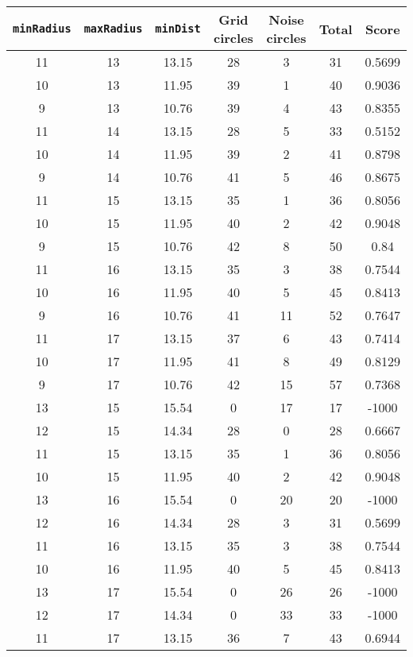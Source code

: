 \documentclass[letterpaper, 12pt]{article}
\begin{document}
\begin{longtable}{|c|c|c|c|c|c|c|}
\hline
\textbf{\texttt{minRadius}} & \textbf{\texttt{maxRadius}} & \textbf{\texttt{minDist}} & \textbf{Grid circles} & \textbf{Noise circles} & \textbf{Total} & \textbf{Score} \\
\hline
11 & 13 & 13.15 & 28 & 3 & 31 & 0.5699 \\
\hline
10 & 13 & 11.95 & 39 & 1 & 40 & 0.9036 \\
\hline
9 & 13 & 10.76 & 39 & 4 & 43 & 0.8355 \\
\hline
11 & 14 & 13.15 & 28 & 5 & 33 & 0.5152 \\
\hline
10 & 14 & 11.95 & 39 & 2 & 41 & 0.8798 \\
\hline
9 & 14 & 10.76 & 41 & 5 & 46 & 0.8675 \\
\hline
11 & 15 & 13.15 & 35 & 1 & 36 & 0.8056 \\
\hline
10 & 15 & 11.95 & 40 & 2 & 42 & 0.9048 \\
\hline
9 & 15 & 10.76 & 42 & 8 & 50 & 0.84 \\
\hline
11 & 16 & 13.15 & 35 & 3 & 38 & 0.7544 \\
\hline
10 & 16 & 11.95 & 40 & 5 & 45 & 0.8413 \\
\hline
9 & 16 & 10.76 & 41 & 11 & 52 & 0.7647 \\
\hline
11 & 17 & 13.15 & 37 & 6 & 43 & 0.7414 \\
\hline
10 & 17 & 11.95 & 41 & 8 & 49 & 0.8129 \\
\hline
9 & 17 & 10.76 & 42 & 15 & 57 & 0.7368 \\
\hline
13 & 15 & 15.54 & 0 & 17 & 17 & -1000 \\
\hline
12 & 15 & 14.34 & 28 & 0 & 28 & 0.6667 \\
\hline
11 & 15 & 13.15 & 35 & 1 & 36 & 0.8056 \\
\hline
10 & 15 & 11.95 & 40 & 2 & 42 & 0.9048 \\
\hline
13 & 16 & 15.54 & 0 & 20 & 20 & -1000 \\
\hline
12 & 16 & 14.34 & 28 & 3 & 31 & 0.5699 \\
\hline
11 & 16 & 13.15 & 35 & 3 & 38 & 0.7544 \\
\hline
10 & 16 & 11.95 & 40 & 5 & 45 & 0.8413 \\
\hline
13 & 17 & 15.54 & 0 & 26 & 26 & -1000 \\
\hline
12 & 17 & 14.34 & 0 & 33 & 33 & -1000 \\
\hline
11 & 17 & 13.15 & 36 & 7 & 43 & 0.6944 \\
\hline

\end{longtable}
\end{document}
